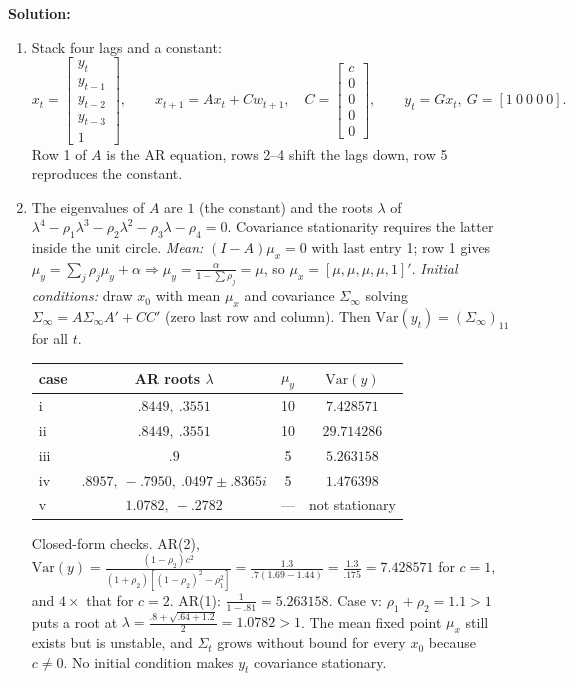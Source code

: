 \documentclass[12pt, letterpaper]{article}
\newcommand{\Var}{\mathrm{Var}}
\begin{document}
\begin{tcolorbox}[evenbox,title={Exercise 2.4 \quad AR(4) with a Constant}]
\textbf{Solution:}

\begin{enumerate}
\item Stack four lags and a constant:
\[
x_t=\begin{bmatrix}y_t\\y_{t-1}\\y_{t-2}\\y_{t-3}\\1\end{bmatrix},\qquad
x_{t+1}=Ax_t+Cw_{t+1},\quad C=\begin{bmatrix}c\\0\\0\\0\\0\end{bmatrix},\qquad y_t=Gx_t,\ G=[1\ 0\ 0\ 0\ 0].
\]
Row 1 of $A$ is the AR equation, rows 2--4 shift the lags down, row 5 reproduces the constant.

\item The eigenvalues of $A$ are $1$ (the constant) and the roots $\lambda$ of
$\lambda^4-\rho_1\lambda^3-\rho_2\lambda^2-\rho_3\lambda-\rho_4=0$. Covariance stationarity requires
the latter inside the unit circle. \emph{Mean:} $(I-A)\mu_x=0$ with last entry 1; row 1 gives
$\mu_y=\sum_j\rho_j\mu_y+\alpha\Rightarrow\mu_y=\frac{\alpha}{1-\sum\rho_j}=\mu$, so
$\mu_x=[\mu,\mu,\mu,\mu,1]'$. \emph{Initial conditions:} draw $x_0$ with mean $\mu_x$ and covariance
$\Sigma_\infty$ solving $\Sigma_\infty=A\Sigma_\infty A'+CC'$ (zero last row and column). Then
$\Var(y_t)=(\Sigma_\infty)_{11}$ for all $t$.

\begin{center}\small
\begin{tabular}{@{}lccc@{}}
\toprule
case & AR roots $\lambda$ & $\mu_y$ & $\Var(y)$\\
\midrule
i & $.8449,\ .3551$ & 10 & $7.428571$\\
ii & $.8449,\ .3551$ & 10 & $29.714286$\\
iii & $.9$ & 5 & $5.263158$\\
iv & $.8957,\ -.7950,\ .0497\pm.8365i$ & 5 & $1.476398$\\
v & $1.0782,\ -.2782$ & --- & not stationary\\
\bottomrule
\end{tabular}
\end{center}
Closed-form checks. AR(2), $\Var(y)=\frac{(1-\rho_2)c^2}{(1+\rho_2)[(1-\rho_2)^2-\rho_1^2]}
=\frac{1.3}{.7(1.69-1.44)}=\frac{1.3}{.175}=7.428571$ for $c=1$, and $4\times$ that for $c=2$.
AR(1): $\frac{1}{1-.81}=5.263158$. Case v: $\rho_1+\rho_2=1.1>1$ puts a root at
$\lambda=\frac{.8+\sqrt{.64+1.2}}{2}=1.0782>1$. The mean fixed point $\mu_x$ still exists but is
unstable, and $\Sigma_t$ grows without bound for every $x_0$ because $c\neq0$. No initial condition
makes $y_t$ covariance stationary.


\end{enumerate}
\end{tcolorbox}
\end{document}
